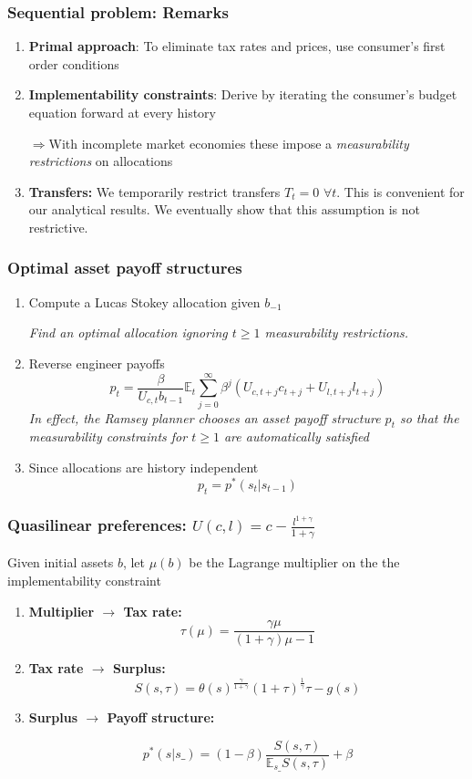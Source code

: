 \documentclass{beamer}
\newcommand{\EE}{\mathbb E}
\begin{document}
  \begin{frame}
  \frametitle{Sequential problem: Remarks}
  \begin{enumerate}
  \item \textbf{Primal approach}: To eliminate tax rates and prices, use  consumer's first order conditions
  \item \textbf{Implementability constraints}:  Derive by iterating the consumer's budget equation forward  at every history

  $\Rightarrow$With incomplete market economies these impose a \emph{measurability restrictions} on allocations

  \item  \textbf{Transfers: } We temporarily restrict transfers $T_t = 0$  $\forall t$. This is convenient for our analytical results.  We eventually show  that this assumption is not restrictive.

  \end{enumerate}


  \end{frame}

 \begin{frame}
\frametitle{Optimal asset payoff structures}
\begin{enumerate}
 \item Compute a Lucas Stokey allocation given $b_{-1}$

 \emph{ Find an  optimal allocation ignoring $t\geq 1$ measurability restrictions.}

 \item Reverse engineer payoffs
\[
	p_t = \frac{\beta}{U_{c,t}b_{t-1}}\EE_t\sum_{j=0}^\infty\beta^j\left(U_{c,t+j}c_{t+j}+U_{l,t+j}l_{t+j}\right)
\]
\emph{In effect,  the Ramsey planner chooses an asset payoff structure $p_t$  so that  the measurability constraints for $t\geq 1$ are automatically satisfied}
\item Since allocations are history independent
\[p_t=p^*(s_t|s_{t-1})\]
\end{enumerate}
\end{frame}

\begin{frame}
\frametitle{Quasilinear preferences: $U(c,l)=c-\frac{l^{1+\gamma}}{1+\gamma}$}
Given initial assets $b$,  let $\mu(b)$ be the Lagrange multiplier on the  the implementability constraint
\begin{enumerate}

 \item \textbf{Multiplier $\to$ Tax rate:}
 \[
		\tau(\mu) = \frac{\gamma\mu}{(1+\gamma)\mu-1}
	\]
 \item \textbf{Tax rate $\to$ Surplus:}
 \[
		S(s,\tau) = \theta(s)^\frac\gamma{1+\gamma}(1+\tau)^\frac1\gamma\tau-g(s)
	\]
\item \textbf{Surplus $\to$ Payoff structure:}

\[
 p^*(s|s\_) = (1-\beta)\frac{S(s,\tau)}{\EE_{s\_} S(s,\tau)} + \beta
 \]

 \end{enumerate}

\end{frame}
\end{document}
